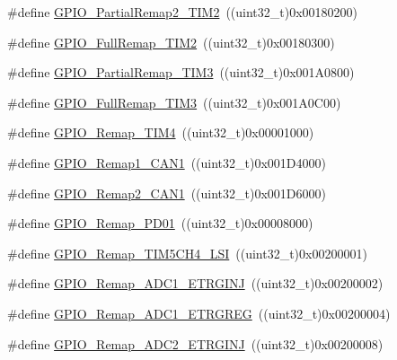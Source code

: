 \begin{DoxyCompactItemize}
\#define \mbox{\hyperlink{group___g_p_i_o___remap__define_ga42908e73dfc201d0a7b4ab0ed6f15eb7}{G\+P\+I\+O\+\_\+\+Partial\+Remap2\+\_\+\+T\+I\+M2}}~((uint32\+\_\+t)0x00180200)
\item 
\#define \mbox{\hyperlink{group___g_p_i_o___remap__define_ga2bd999e77236155935d2a598d4bac2a9}{G\+P\+I\+O\+\_\+\+Full\+Remap\+\_\+\+T\+I\+M2}}~((uint32\+\_\+t)0x00180300)
\item 
\#define \mbox{\hyperlink{group___g_p_i_o___remap__define_gaaced3961a038fd8b41abfaf55d24f609}{G\+P\+I\+O\+\_\+\+Partial\+Remap\+\_\+\+T\+I\+M3}}~((uint32\+\_\+t)0x001\+A0800)
\item 
\#define \mbox{\hyperlink{group___g_p_i_o___remap__define_ga8ba8cef32c5076db1872e173f873dae6}{G\+P\+I\+O\+\_\+\+Full\+Remap\+\_\+\+T\+I\+M3}}~((uint32\+\_\+t)0x001\+A0\+C00)
\item 
\#define \mbox{\hyperlink{group___g_p_i_o___remap__define_ga041b2f02b32895ce34bcd7499c9e873f}{G\+P\+I\+O\+\_\+\+Remap\+\_\+\+T\+I\+M4}}~((uint32\+\_\+t)0x00001000)
\item 
\#define \mbox{\hyperlink{group___g_p_i_o___remap__define_ga89ac81224968d8faf42475be664c1e09}{G\+P\+I\+O\+\_\+\+Remap1\+\_\+\+C\+A\+N1}}~((uint32\+\_\+t)0x001\+D4000)
\item 
\#define \mbox{\hyperlink{group___g_p_i_o___remap__define_gad4f5b46cf24bed1563b22e6ecca3ebef}{G\+P\+I\+O\+\_\+\+Remap2\+\_\+\+C\+A\+N1}}~((uint32\+\_\+t)0x001\+D6000)
\item 
\#define \mbox{\hyperlink{group___g_p_i_o___remap__define_gaeac44191de99d55a5fa03e29b74d5e59}{G\+P\+I\+O\+\_\+\+Remap\+\_\+\+P\+D01}}~((uint32\+\_\+t)0x00008000)
\item 
\#define \mbox{\hyperlink{group___g_p_i_o___remap__define_gad909488d0b7a0cfa1116a66e962e3c62}{G\+P\+I\+O\+\_\+\+Remap\+\_\+\+T\+I\+M5\+C\+H4\+\_\+\+L\+SI}}~((uint32\+\_\+t)0x00200001)
\item 
\#define \mbox{\hyperlink{group___g_p_i_o___remap__define_gaf79d966f49b64d3feb0ba9cc39294dac}{G\+P\+I\+O\+\_\+\+Remap\+\_\+\+A\+D\+C1\+\_\+\+E\+T\+R\+G\+I\+NJ}}~((uint32\+\_\+t)0x00200002)
\item 
\#define \mbox{\hyperlink{group___g_p_i_o___remap__define_gab1d040cab5d9f16f362edc2e8b47a82a}{G\+P\+I\+O\+\_\+\+Remap\+\_\+\+A\+D\+C1\+\_\+\+E\+T\+R\+G\+R\+EG}}~((uint32\+\_\+t)0x00200004)
\item 
\#define \mbox{\hyperlink{group___g_p_i_o___remap__define_gae00aaabeed54e805932ec6978acf000d}{G\+P\+I\+O\+\_\+\+Remap\+\_\+\+A\+D\+C2\+\_\+\+E\+T\+R\+G\+I\+NJ}}~((uint32\+\_\+t)0x00200008)

\end{DoxyCompactItemize}
